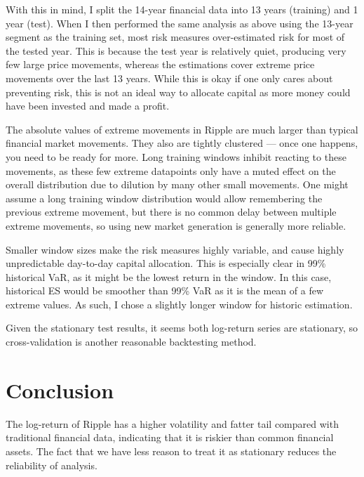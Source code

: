 \documentclass{article}
\newcommand{\ciapdf}[1]{\resizebox{\textwidth}{!}{\texttt{[image: \#1]}}}
\begin{document}
\ciapdf{assignment_1/report_pic/FXPara5Y.pdf}

With this in mind, I split the 14-year financial data into 13 years (training)
and 1 year (test). When I then performed the same analysis as above using the
13-year segment as the training set, most risk measures
over-estimated risk for most of the tested year. This is because the test year
is relatively quiet, producing very few large price movements, whereas the
estimations cover extreme price movements over the last 13 years. While this is
okay if one only cares about preventing risk, this is not an ideal way to
allocate capital as more money could have been invested and made a profit.

\ciapdf{assignment_1/report_pic/FXParaAll.pdf}

The absolute values of extreme movements in Ripple are much larger than typical
financial market movements. They also are tightly clustered --- once one
happens, you need to be ready for more. Long training windows inhibit reacting
to these movements, as these few extreme datapoints only have a muted effect on
the overall distribution due to dilution by many other small movements. One
might assume a long training window distribution would allow remembering the
previous extreme movement, but there is no common delay between multiple
extreme movements, so using new market generation is generally more reliable.

\ciapdf{assignment_1/report_pic/RipplePara180D.pdf}

Smaller window sizes make the risk measures highly variable, and cause highly
unpredictable day-to-day capital allocation. This is especially clear in 99\%
historical VaR, as it might be the lowest return in the window. In this case,
historical ES would be smoother than 99\% VaR as it is the mean of a few
extreme values. As such, I chose a slightly longer window for historic
estimation.

\ciapdf{assignment_1/report_pic/RipplePara350D.pdf}

Given the stationary test results, it seems both log-return series are
stationary, so cross-validation is another reasonable backtesting method.

\section*{Conclusion}

The log-return of Ripple has a higher volatility and fatter tail compared with
traditional financial data, indicating that it is riskier than common financial
assets. The fact that we have less reason to treat it as stationary reduces the
reliability of analysis.
\end{document}
